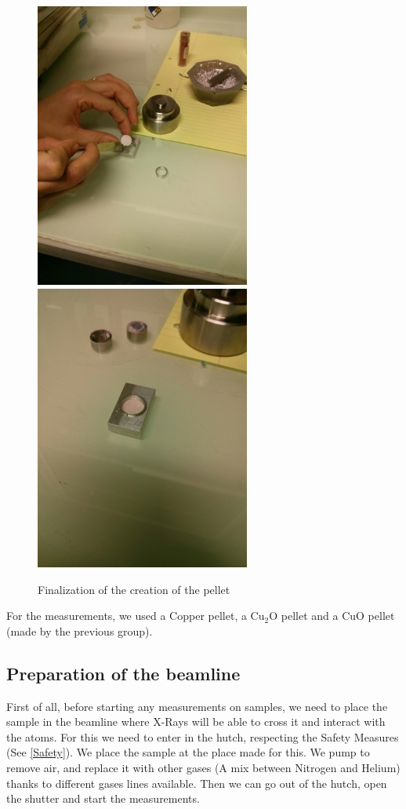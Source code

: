 \documentclass[11pt,a4paper,oneside]{report}
\begin{document}
\begin{figure}[H]
\centering
\includegraphics[width=200pt]{Images/pellet2.jpg}
\includegraphics[width=200pt]{Images/pellet3.jpg}
\caption{Finalization of the creation of the pellet}
\label{pellet}    
\end{figure} 

For the measurements, we used a Copper pellet, a Cu$_2$O pellet and a CuO pellet (made by the previous group).

\subsection{Preparation of the beamline}

First of all, before starting any measurements on samples, we need to place the sample in the beamline where X-Rays will be able to cross it and interact with the atoms. For this we need to enter in the hutch, respecting the Safety Measures (See \ref{Safety}). We place the sample at the place made for this. We pump to remove air, and replace it with other gases (A mix between Nitrogen and Helium) thanks to different gases lines available. Then we can go out of the hutch, open the shutter and start the measurements.
\end{document}
